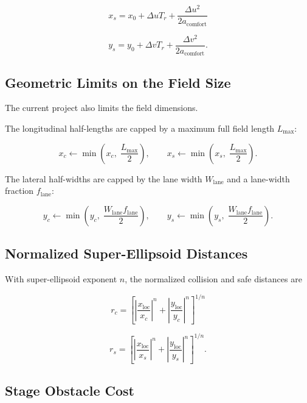 \documentclass[11pt]{article}
\begin{document}
\begin{equation}
x_s = x_0 + \Delta u T_r + \frac{\Delta u^2}{2a_{\mathrm{comfort}}}
\end{equation}

\begin{equation}
y_s = y_0 + \Delta v T_r + \frac{\Delta v^2}{2a_{\mathrm{comfort}}}.
\end{equation}

\subsection{Geometric Limits on the Field Size}

The current project also limits the field dimensions.

The longitudinal half-lengths are capped by a maximum full field length
$L_{\max}$:

\begin{equation}
x_c \leftarrow \min\left(x_c,\; \frac{L_{\max}}{2}\right),
\qquad
x_s \leftarrow \min\left(x_s,\; \frac{L_{\max}}{2}\right).
\end{equation}

The lateral half-widths are capped by the lane width $W_{\mathrm{lane}}$ and a
lane-width fraction $f_{\mathrm{lane}}$:

\begin{equation}
y_c \leftarrow \min\left(y_c,\; \frac{W_{\mathrm{lane}}f_{\mathrm{lane}}}{2}\right),
\qquad
y_s \leftarrow \min\left(y_s,\; \frac{W_{\mathrm{lane}}f_{\mathrm{lane}}}{2}\right).
\end{equation}

\subsection{Normalized Super-Ellipsoid Distances}

With super-ellipsoid exponent $n$, the normalized collision and safe distances are

\begin{equation}
r_c
=
\left[
\left|\frac{x_{\mathrm{loc}}}{x_c}\right|^n
+
\left|\frac{y_{\mathrm{loc}}}{y_c}\right|^n
\right]^{1/n}
\end{equation}

\begin{equation}
r_s
=
\left[
\left|\frac{x_{\mathrm{loc}}}{x_s}\right|^n
+
\left|\frac{y_{\mathrm{loc}}}{y_s}\right|^n
\right]^{1/n}.
\end{equation}

\subsection{Stage Obstacle Cost}
\end{document}
